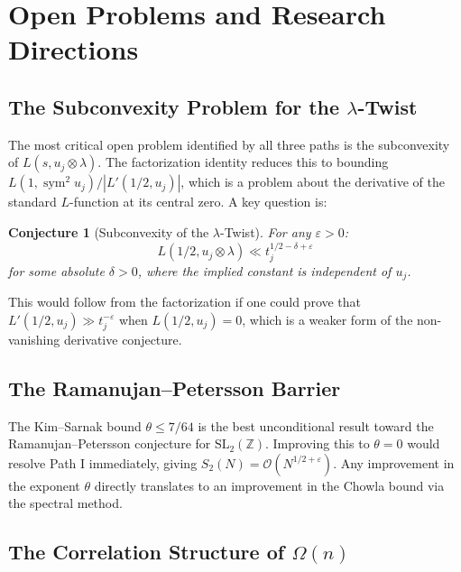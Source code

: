 \documentclass[11pt,a4paper]{article}
\theoremstyle{plain}
\newtheorem{conjecture}[theorem]{Conjecture}
\theoremstyle{definition}
\newcommand{\SL}{\mathrm{SL}_2}
\newcommand{\sym}{\operatorname{sym}}
\begin{document}
\section{Open Problems and Research Directions}

\subsection{The Subconvexity Problem for the $\lambda$-Twist}

The most critical open problem identified by all three paths is the subconvexity of $L(s, u_j \otimes \lambda)$. The factorization identity reduces this to bounding $L(1, \sym^2 u_j)/|L'(1/2, u_j)|$, which is a problem about the derivative of the standard $L$-function at its central zero. A key question is:

\begin{conjecture}[Subconvexity of the $\lambda$-Twist]
For any $\varepsilon > 0$:
\begin{equation}\label{eq:subconvexity-conj}
L(1/2, u_j \otimes \lambda) \ll t_j^{1/2 - \delta + \varepsilon}
\end{equation}
for some absolute $\delta > 0$, where the implied constant is independent of $u_j$.
\end{conjecture}

This would follow from the factorization if one could prove that $L'(1/2, u_j) \gg t_j^{-\varepsilon}$ when $L(1/2, u_j) = 0$, which is a weaker form of the non-vanishing derivative conjecture.

\subsection{The Ramanujan--Petersson Barrier}

The Kim--Sarnak bound $\theta \leq 7/64$ is the best unconditional result toward the Ramanujan--Petersson conjecture for $\SL(\mathbb{Z})$. Improving this to $\theta = 0$ would resolve Path I immediately, giving $S_2(N) = \mathcal{O}(N^{1/2+\varepsilon})$. Any improvement in the exponent $\theta$ directly translates to an improvement in the Chowla bound via the spectral method.

\subsection{The Correlation Structure of $\Omega(n)$}
\end{document}
